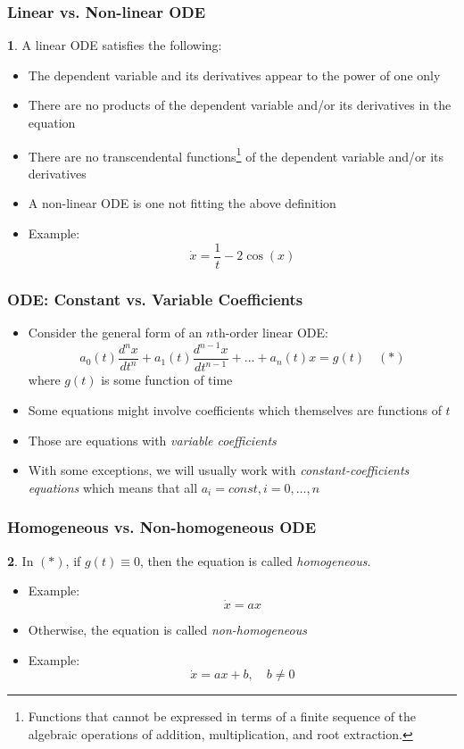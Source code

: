\documentclass[10pt,usenames,dvipsnames]{beamer}
\theoremstyle{definition}
\newtheorem{definition}{\translate{Definition}}
\begin{document}
\begin{frame}[fragile]
\frametitle{Linear vs. Non-linear ODE}
\begin{definition}
	A linear ODE satisfies the following:
	\begin{itemize}
	 	\item The dependent variable and its derivatives appear to the power of one only
	 	\item There are no products of the dependent variable and/or its derivatives in the equation
	 	\item There are no transcendental functions\footnote{Functions that cannot be expressed in terms of a finite sequence of the algebraic operations of addition, multiplication, and root extraction.} of the dependent variable and/or its derivatives
	 \end{itemize} 
\end{definition}
\begin{itemize}
	\item A non-linear ODE is one not fitting the above definition
	\item Example:
	\[
		\dot{x} = \dfrac{1}{t} -2\cos(x)
	\]
\end{itemize}
\end{frame}

\begin{frame}[fragile]
\frametitle{ODE: Constant vs. Variable Coefficients}
\begin{itemize}
	\item Consider the general form of an $n$th-order linear ODE:
	\[
		a_{0}(t)\dfrac{d^{n}x}{dt^{n}} + a_{1}(t)\dfrac{d^{n-1}x}{dt^{n-1}} + \ldots + a_{n}(t)x = g(t) \quad (*)
	\]
	where $g(t)$ is some function of time
	\item Some equations might involve coefficients which themselves are functions of $t$ 
	\item Those are equations with \textit{variable coefficients} 
	\item With some exceptions, we will usually work with \textit{constant-coefficients equations} which means that all $a_{i} = const,i = 0,\ldots,n$
\end{itemize}
\end{frame}

\begin{frame}[fragile]
\frametitle{Homogeneous vs. Non-homogeneous ODE}
\begin{definition}
	In $(*)$, if $g(t) \equiv 0$, then the equation is called \textit{homogeneous}.
\end{definition}
\begin{itemize}
	\item Example:
	\[
		\dot{x} = ax
	\]
	\item Otherwise, the equation is called \textit{non-homogeneous}
		\item Example:
	\[
		\dot{x} = ax + b, \quad b \neq 0
	\]
\end{itemize}
\end{frame}
\end{document}
